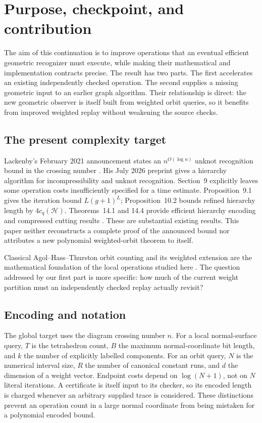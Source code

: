 \section{Purpose, checkpoint, and contribution}
\label{sec:scope}

The aim of this continuation is to improve operations that an eventual
efficient geometric recognizer must execute, while making their mathematical
and implementation contracts precise. The result has two parts. The first
accelerates an existing independently checked operation. The second supplies
a missing geometric input to an earlier graph algorithm. Their relationship
is direct: the new geometric observer is itself built from weighted orbit
queries, so it benefits from improved weighted replay without weakening the
source checks.

\subsection{The present complexity target}

Lackenby's February 2021 announcement states an
\(n^{O(\log n)}\) unknot recognition bound in the crossing number
\cite{announcement,talk}. His July 2026 preprint gives a hierarchy algorithm
for incompressibility and unknot recognition. Section~9 explicitly leaves
some operation costs insufficiently specified for a time estimate.
Proposition~9.1 gives the iteration bound \(L(g+1)^L\);
Proposition~10.2 bounds refined hierarchy length by
\(4c_q(\mathcal H)\). Theorems~14.1 and 14.4 provide efficient hierarchy
encoding and compressed cutting results \cite{lackenby26}. These are
substantial existing results. This paper neither reconstructs a complete
proof of the announced bound nor attributes a new polynomial weighted-orbit
theorem to itself.

Classical Agol--Hass--Thurston orbit counting and its weighted extension are
the mathematical foundation of the local operations studied here
\cite[Theorems~12 and 16]{aht}. The question addressed by our first part is
more specific: how much of the current weight partition must an independently
checked replay actually revisit?

\subsection{Encoding and notation}

The global target uses the diagram crossing number \(n\). For a local
normal-surface query, \(T\) is the tetrahedron count, \(B\) the maximum
normal-coordinate bit length, and \(k\) the number of explicitly labelled
components. For an orbit query, \(N\) is the numerical interval size,
\(R\) the number of canonical constant runs, and \(d\) the dimension of a
weight vector. Endpoint costs depend on \(\log(N+1)\), not on \(N\)
literal iterations. A certificate is itself input to its checker, so its
encoded length is charged whenever an arbitrary supplied trace is
considered. These distinctions prevent an operation count in a large
normal coordinate from being mistaken for a polynomial encoded bound.

